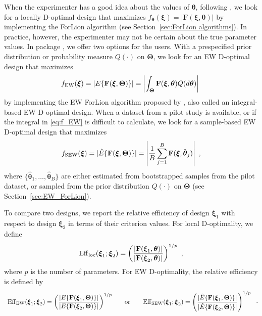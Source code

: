 When the experimenter has a good idea about the values of $\boldsymbol \theta$, following \cite{huang2024forlion}, we look for a locally D-optimal design that maximizes $f_{\boldsymbol{\theta}}(\boldsymbol \xi)=| \mathbf F(\boldsymbol \xi, \boldsymbol \theta)|$ by implementing the ForLion algorithm (see Section~\ref{sec:ForLion algorithms}). 
In practice, however, the experimenter may not be certain about the true parameter values. In package , we offer two options for the users. With a prespecified prior distribution or probability measure $Q(\cdot)$ on $\boldsymbol{\Theta}$, we look for an EW D-optimal design \citep{atkinson2007, ymm2016, ytm2016, bu2020, huang2025constrained, lin2025ew} that maximizes 
\begin{equation}\label{eq:f_EW}
f_{\rm EW}(\boldsymbol{\xi}) = |E\{{\mathbf F}(\boldsymbol{\xi}, \boldsymbol{\Theta})\}| = \left|\int_{\boldsymbol{\Theta}} {\mathbf F}(\boldsymbol{\xi}, \boldsymbol{\theta}) Q(d\boldsymbol{\theta})\right|\ 
\end{equation}
by implementing the EW ForLion algorithm proposed by \cite{lin2025ew}, also called an integral-based EW D-optimal design. When a dataset from a pilot study is available, or if the integral in \eqref{eq:f_EW} is difficult to calculate, we look for a sample-based EW D-optimal design \citep{lin2025ew} that maximizes
\begin{equation}\label{eq:f_SEW}
f_{\rm SEW}(\boldsymbol{\xi}) = |\hat{E}\{{\mathbf F}(\boldsymbol{\xi}, \boldsymbol{\Theta})\}| = \left|\frac{1}{B}\sum_{j=1}^B {\mathbf F}(\boldsymbol{\xi}, \hat{\boldsymbol{\theta}}_j) \right|\ ,
\end{equation}
where $\{\hat{\boldsymbol{\theta}}_1, \ldots, \hat{\boldsymbol{\theta}}_B\}$ are either estimated from bootstrapped samples from the pilot dataset, or sampled from the prior distribution $Q(\cdot)$ on $\boldsymbol{\Theta}$ (see Section~\ref{sec:EW_ForLion}). 

To compare two designs, we report the relative efficiency of design $\boldsymbol{\xi}_1$ with respect to design $\boldsymbol{\xi}_2$ in terms of their criterion values. For local D-optimality, we define
\[
\mathrm{Eff}_{\mathrm{loc}}(\boldsymbol{\xi}_1;\boldsymbol{\xi}_2)=\left(\frac{|{\mathbf F}(\boldsymbol{\xi}_{\rm 1}, \boldsymbol\theta)|}{|{\mathbf F}(\boldsymbol{\xi}_{\rm 2}, \boldsymbol\theta)|}\right)^{1/p}\ ,
\]
where $p$ is the number of parameters.
For EW D-optimality, the relative efficiency is defined by
\[
\begin{array}{c@{\qquad\text{or}\qquad}c}
\displaystyle
\mathrm{Eff}_{\mathrm{EW}}(\boldsymbol{\xi}_1;\boldsymbol{\xi}_2)
=\left(\frac{|E\{{\mathbf F}({\boldsymbol{\xi}}_{1}, \boldsymbol{\Theta})\}|}
{|E\{{\mathbf F}({\boldsymbol{\xi}}_{2}, \boldsymbol{\Theta})\}|}\right)^{1/p}
&
\displaystyle
\mathrm{Eff}_{\mathrm{SEW}}(\boldsymbol{\xi}_1;\boldsymbol{\xi}_2)
=\left(\frac{|\hat{E}\{{\mathbf F}({\boldsymbol{\xi}}_{1}, \boldsymbol{\Theta})\}|}
{|\hat{E}\{{\mathbf F}({\boldsymbol{\xi}}_{2}, \boldsymbol{\Theta})\}|}\right)^{1/p}
\end{array}\ .
\]

